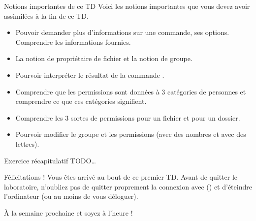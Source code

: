 \documentclass[a4paper,11pt]{style-esi/td}
\begin{document}
	\begin{theorie}{Notions importantes de ce TD}
		Voici les notions importantes que vous devez avoir assimilées à la fin de ce TD.
		\begin{itemize}
		\item 
			Pouvoir demander plus d'informations sur une commande, ses options.
			Comprendre les informations fournies.
		\item 
			La notion de propriétaire de fichier et la notion de groupe.
		\item 
			Pourvoir interpréter le résultat de la commande . 
		\item 
			Comprendre que les permissions sont données à 3 catégories de personnes
			et comprendre ce que ces catégories signifient.
		\item 
			Comprendre les 3 sortes de permissions pour un fichier et pour un dossier.
		\item 
			Pourvoir modifier le groupe et les permissions
			(avec des nombres et avec des lettres).
		\end{itemize}
	\end{theorie}

	\begin{Exercice}{Exercice récapitulatif}
		TODO\dots
	\end{Exercice}

	\bigskip
	\begin{infotbox}{Félicitations !} 
		Vous êtes arrivé au bout de ce premier TD.
		Avant de quitter le laboratoire, n'oubliez pas de quitter proprement 
		la connexion avec  () 
		et d'éteindre l'ordinateur (ou au moins de vous déloguer).

		À la semaine prochaine et soyez à l'heure !
	\end{infotbox}
\end{document}
